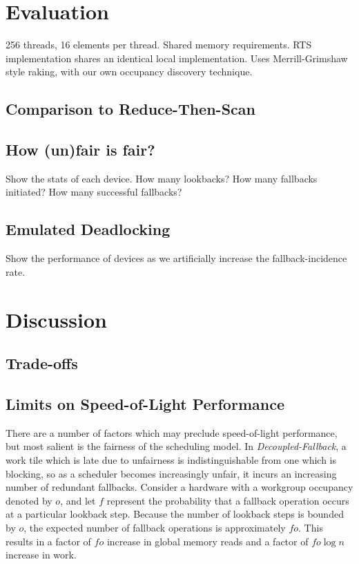 \documentclass[sigconf]{acmart}
\begin{document}
\section{Evaluation}
256 threads, 16 elements per thread. Shared memory requirements. RTS implementation shares an identical local implementation. Uses Merrill-Grimshaw style raking, with our own occupancy discovery technique. 

\subsection{Comparison to Reduce-Then-Scan}

\subsection{How (un)fair is fair?}
Show the stats of each device. How many lookbacks?  How many fallbacks initiated? How many successful fallbacks?

\subsection{Emulated Deadlocking}
Show the performance of devices as we artificially increase the fallback-incidence rate.

\section{Discussion}

\subsection{Trade-offs}

\subsection{Limits on Speed-of-Light Performance}
There are a number of factors which may preclude speed-of-light performance, but most salient is the fairness of the scheduling model. In \emph{Decoupled-Fallback}, a work tile which is late due to unfairness is indistinguishable from one which is blocking, so as a scheduler becomes increasingly unfair, it incurs an increasing number of redundant fallbacks. Consider a hardware with a workgroup occupancy denoted by $o$, and let $f$ represent the probability that a fallback operation occurs at a particular lookback step. Because the number of lookback steps is bounded by $o$, the expected number of fallback operations is approximately $fo$. This results in a factor of $fo$ increase in global memory reads and a factor of $fo\log{n}$ increase in work.
\end{document}
